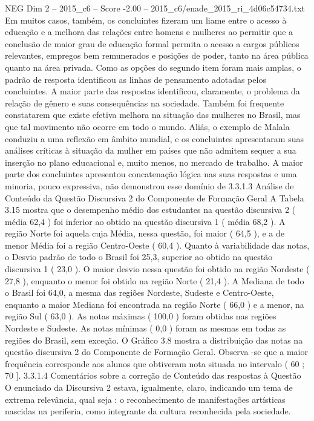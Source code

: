 \begin{textsample}{NEG Dim 2 – 2015\_c6 – Score -2.00 – 2015\_c6/enade\_2015\_ri\_4d06c54734.txt}
Em muitos casos, também, os concluintes fizeram um liame entre o acesso à educação e a melhora das relações entre homens e mulheres ao permitir que a conclusão de maior grau de educação formal permita o acesso a cargos públicos relevantes, empregos bem remunerados e posições de poder, tanto na área pública quanto na área privada.
Como as opções do segundo item foram mais amplas, o padrão de resposta identificou as linhas de pensamento adotadas pelos concluintes.
A maior parte das respostas identificou, claramente, o problema da relação de gênero e suas consequências na sociedade.
Também foi frequente constatarem que existe efetiva melhora na situação das mulheres no Brasil, mas que tal movimento não ocorre em todo o mundo.
Aliás, o exemplo de Malala conduziu a uma reflexão em âmbito mundial, e os concluintes apresentaram suas análises críticas à situação da mulher em países que não admitem sequer a sua inserção no plano educacional e, muito menos, no mercado de trabalho.
A maior parte dos concluintes apresentou concatenação lógica nas suas respostas e uma minoria, pouco expressiva, não demonstrou esse domínio de 3.3.1.3 Análise de Conteúdo da Questão Discursiva 2 do Componente de Formação Geral A Tabela 3.15 mostra que o desempenho médio dos estudantes na questão discursiva 2 ( média 62,4 ) foi inferior ao obtido na questão discursiva 1 ( média 68,2 ).
A região Norte foi aquela cuja Média, nessa questão, foi maior ( 64,5 ), e a de menor Média foi a região Centro-Oeste ( 60,4 ).
Quanto à variabilidade das notas, o Desvio padrão de todo o Brasil foi 25,3, superior ao obtido na questão discursiva 1 ( 23,0 ).
O maior desvio nessa questão foi obtido na região Nordeste ( 27,8 ), enquanto o menor foi obtido na região Norte ( 21,4 ).
A Mediana de todo o Brasil foi 64,0, a mesma das regiões Nordeste, Sudeste e Centro-Oeste, enquanto a maior Mediana foi encontrada na região Norte ( 66,0 ) e a menor, na região Sul ( 63,0 ).
As notas máximas ( 100,0 ) foram obtidas nas regiões Nordeste e Sudeste.
As notas mínimas ( 0,0 ) foram as mesmas em todas as regiões do Brasil, sem exceção.
O Gráfico 3.8 mostra a distribuição das notas na questão discursiva 2 do Componente de Formação Geral.
Observa -se que a maior frequência corresponde aos alunos que obtiveram nota situada no intervalo ( 60 ; 70 ]. 3.3.1.4 Comentários sobre a correção de Conteúdo das respostas à Questão O enunciado da Discursiva 2 estava, igualmente, claro, indicando um tema de extrema relevância, qual seja : o reconhecimento de manifestações artísticas nascidas na periferia, como integrante da cultura reconhecida pela sociedade.

\end{textsample}
